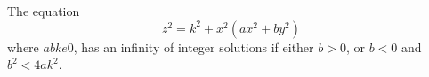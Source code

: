 \begin{proposition}\label{eq:152}
    The equation
\[
    z^2=k^2+x^2(ax^2+by^2)
\]
    where $abk
    e0$, has an infinity of integer solutions if either $b>0$, or $b<0$ and $b^2<4ak^2$.
\end{proposition}
